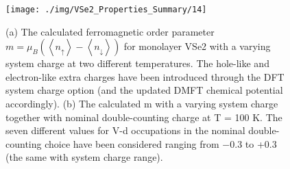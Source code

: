 \documentclass[reprint, aps, prb, showkeys]{revtex4-2}
\begin{document}
\begin{figure}
    \texttt{[image: ./img/VSe2\_Properties\_Summary/14]}
    \caption{\label{fig:Kim_2020_ChargeChange} 
    (a) The calculated ferromagnetic order parameter $m = \mu_B(\left\langle n_{\uparrow} \right\rangle - \left\langle n_{\downarrow} \right\rangle)$ for monolayer VSe2 with a varying system charge at two different temperatures. The hole-like and electron-like extra charges have been introduced through the DFT system charge option (and the updated DMFT chemical potential accordingly). (b) The calculated m with a varying system charge together with nominal double-counting charge at T = 100 K. The seven different values for V-d occupations in the nominal double-counting choice have been considered ranging from −0.3 to +0.3 (the same with system charge range).
    }
\end{figure}


\end{document}
